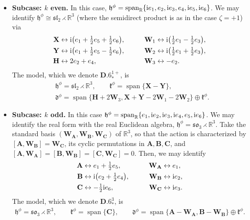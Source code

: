 \documentclass[10pt,a4paper]{amsart}
\newlength{\caseIndent}
\DeclareMathOperator{\spanOperator}{span}
\newcommand{\Span}[1]{\spanOperator\{{#1}\}}
\newcommand{\bbR}{\mathbb{R}}
\newcommand{\mbA}{\mathbf{A}}
\newcommand{\mbB}{\mathbf{B}}
\newcommand{\mbC}{\mathbf{C}}
\newcommand{\mbH}{\mathbf{H}}
\newcommand{\mbW}{\mathbf{W}}
\newcommand{\mbX}{\mathbf{X}}
\newcommand{\mbY}{\mathbf{Y}}
\newcommand{\mfd} {\mathfrak{d}}
\newcommand{\mfh} {\mathfrak{h}}
\newcommand{\mfk} {\mathfrak{k}}
\newcommand{\mfsl} {\mathfrak{sl}}
\newcommand{\mfso} {\mathfrak{so}}
\numberwithin{equation}{section}
\begin{document}
\begin{itemize}[leftmargin=\caseIndent]
	\item[] \textbf{Subcase: $k$ even.} In this case, $\mfh^{\phi} = \spanOperator_{\bbR}\{{\rm i} e_1, e_2, {\rm i} e_3, e_4, {\rm i} e_5, {\rm i} e_6\}$. We may identify $\mfh^{\phi} \cong \mfsl_2 \rightthreetimes \bbR^3$ (where the semidirect product is as in the case $\zeta = + 1$) via
	\begin{alignat*}{4}
		 \mbX &\leftrightarrow {\rm i}\big(e_1 + \tfrac{1}{2} e_5 + \tfrac{1}{2} e_6\big) , \qquad
		&\mbW_1 &\leftrightarrow {\rm i}\big(\tfrac{1}{2} e_1 - \tfrac{1}{2} e_3\big) , \\
		 \mbY &\leftrightarrow {\rm i}\big(e_1 + \tfrac{1}{2} e_5 - \tfrac{1}{2} e_6\big) , \qquad
		&\mbW_2 &\leftrightarrow {\rm i}\big(\tfrac{1}{2} e_1 + \tfrac{1}{2} e_3\big) , \\
		 \mbH &\leftrightarrow 2 e_2 + e_4 , \qquad
		&\mbW_3 &\leftrightarrow -e_2 .
	\end{alignat*}
The model, which we denote $\mathbf{D.6}_{\ast}^{1+}$, is
		\begin{equation*}
			\boxed{
 \begin{split}
 &\mfh^{\phi} = \mfsl_2 \rightthreetimes \bbR^3 , \qquad
	 	 \mfk^{\phi} = \Span{\mbX - \mbY} , \\
 &\mfd^{\phi} = \Span{\mbH + 2 \mbW_3, \mbX + \mbY - 2 \mbW_1 - 2 \mbW_2} \oplus \mfk^{\phi} .
 \end{split}
			}
		\end{equation*}
	\item[] \textbf{Subcase: $k$ odd.} In this case $\mfh^{\phi} = \spanOperator_{\bbR}\{e_1, {\rm i} e_2, {\rm i} e_3, {\rm i} e_4, e_5, {\rm i} e_6\}$. We may identify the real form with the real Euclidean algebra, $\mfh^{\phi} = \mfso_3 \rightthreetimes \bbR^3$. Take the standard basis $(\mbW_{\mbA}, \mbW_{\mbB}, \mbW_{\mbC})$ of $\bbR^3$, so that the action is characterized by $[\mbA, \mbW_{\mbB}] = \mbW_{\mbC}$, its cyclic permutations in $\mbA, \mbB, \mbC$, and $[\mbA, \mbW_{\mbA}] = [\mbB, \mbW_{\mbB}] = [\mbC, \mbW_{\mbC}] = 0$. Then, we may identify
	\begin{alignat*}{4}
		 \mbA &\leftrightarrow e_1 + \tfrac{1}{2} e_5 , \qquad
		&\mbW_{\mbA} &\leftrightarrow e_1 , \\
		 \mbB &\leftrightarrow {\rm i} \big(e_2 + \tfrac{1}{2} e_4\big) , \qquad
		&\mbW_{\mbB} &\leftrightarrow {\rm i} e_2 , \\
		 \mbC &\leftrightarrow -\tfrac{1}{2} {\rm i} e_6 , \qquad
		&\mbW_{\mbC} &\leftrightarrow {\rm i} e_3 .
	\end{alignat*}
The model, which we denote $\mathbf{D.6}_{\ast}^3$, is
	\begin{gather*}
		\boxed{
 \mfh^{\phi} = \mfso_3 \rightthreetimes \bbR^3 , \qquad
			\mfk^{\phi} = \Span{\mbC} , \qquad
			\mfd^{\phi} = \Span{\mbA - \mbW_{\mbA}, \mbB - \mbW_{\mbB}} \oplus \mfk^{\phi} .
		}
	\end{gather*}
\end{itemize}
\end{document}
